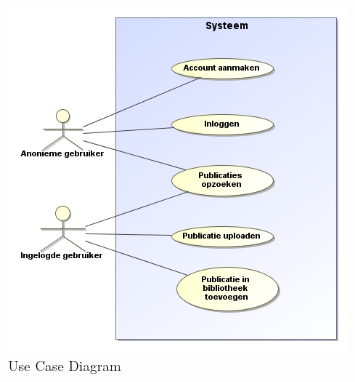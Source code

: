 \begin{figure}[p]
    \centering
    \includegraphics[width=0.8\textwidth]{use-case-diagram}
    \caption{Use Case Diagram}
    \label{fig:use-case-diagram}
\end{figure}